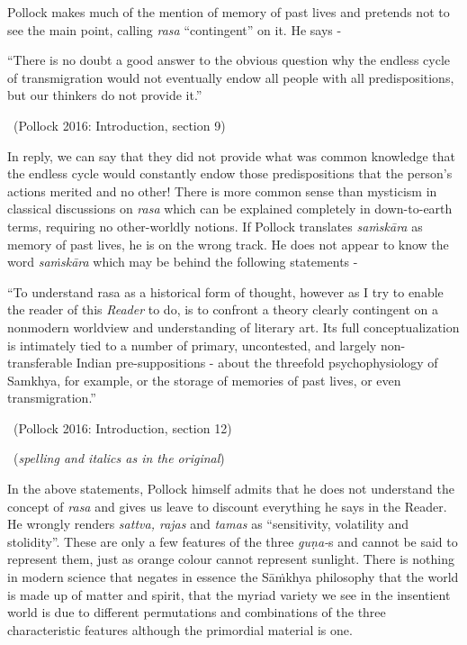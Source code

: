Pollock makes much of the mention of memory of past lives and pretends not to see the main point, calling \textit{rasa} “contingent” on it. He says -

\begin{myquote}
“There is no doubt a good answer to the obvious question why the endless cycle of transmigration would not eventually endow all people with all predispositions, but our thinkers do not provide it.” 

~\hfill (Pollock 2016: Introduction, section 9)
\end{myquote}

In reply, we can say that they did not provide what was common knowledge that the endless cycle would constantly endow those predispositions that the person’s actions merited and no other! There is more common sense than mysticism in classical discussions on \textit{rasa} which can be explained completely in down-to-earth terms, requiring no other-worldly notions. If Pollock translates \textit{saṁskāra} as memory of past lives, he is on the wrong track. He does not appear to know the word \textit{saṁskāra} which may be behind the following statements -

\begin{myquote}
“To understand rasa as a historical form of thought, however as I try to enable the reader of this \textit{Reader} to do, is to confront a theory clearly contingent on a nonmodern worldview and understanding of literary art. Its full conceptualization is intimately tied to a number of primary, uncontested, and largely non-transferable Indian pre-suppositions - about the threefold psychophysiology of Samkhya, for example, or the storage of memories of past lives, or even transmigration.” 

~\hfill (Pollock 2016: Introduction, section 12)
\end{myquote}

\vspace{-.2cm}

\begin{myquote}

~\hfill (\textit{spelling and italics as in the original})
\end{myquote}

In the above statements, Pollock himself admits that he does not understand the concept of \textit{rasa }and gives us leave to discount everything he says in the Reader. He wrongly renders \textit{sattva, rajas} and \textit{tamas} as “sensitivity, volatility and stolidity”. These are only a few features of the three \textit{guṇa-}s and cannot be said to represent them, just as orange colour cannot represent sunlight. There is nothing in modern science that negates in essence the Sāṁkhya philosophy that the world is made up of matter and spirit, that the myriad variety we see in the insentient world is due to different permutations and combinations of the three characteristic features although the primordial material is one.

